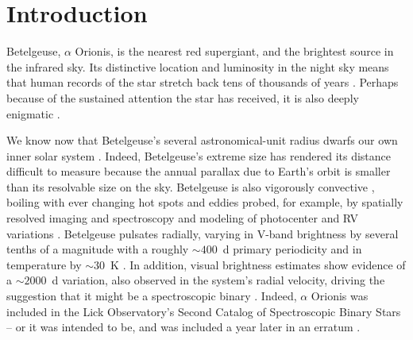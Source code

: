 \documentclass[twocolumn]{aastex631}
\begin{document}
\section{Introduction}

Betelgeuse, $\alpha$ Orionis, is the nearest red supergiant, and the brightest source in the infrared sky. Its distinctive location and luminosity in the night sky means that human records of the star stretch back tens of thousands of years \citep[e.g.][]{2014JAHH...17..180L,2018AuJAn..29...89H,2018JAHH...21....7S,2022MNRAS.516..693N,2023A&G....64.1.38N,2023mgm..conf.3519S}. Perhaps because of the sustained attention the star has received, it is also deeply enigmatic \citep{2023A&G....64.3.11W}. %

We know now that Betelgeuse's several astronomical-unit radius dwarfs our own inner solar system \citep{1921ApJ....53..249M,1996ApJ...463L..29G,2014A&A...572A..17M,2017ars..book.....L}. Indeed, Betelgeuse's extreme size has rendered its distance difficult to measure because the annual parallax due to Earth's orbit is smaller than its resolvable size on the sky. Betelgeuse is also vigorously convective \citep[e.g.][]{1998Natur.392..575L,2008AJ....135.1450G}, boiling with ever changing hot spots and eddies probed, for example, by spatially resolved imaging \citep{1996ApJ...463L..29G,2009A&A...508..923H,2018A&A...609A..67K} and spectroscopy \citep{2000ApJ...545..454L,2020ApJ...899...68D} and modeling of photocenter and RV variations \citep{2012JCoPh.231..919F,2017A&A...600A.137F,2022ApJ...929..156G,2023A&A...669A..49A}. Betelgeuse pulsates radially, varying in V-band brightness by several tenths of a magnitude with a roughly $\sim 400$~d primary periodicity \citep{2020ApJ...902...63J,2023NewA...9901962J} and in temperature by $\sim 30$~K \citep{2020ApJ...905...34H,2022JAVSO..50..205W}. In addition, visual brightness estimates show evidence of a $\sim 2000$~d variation, also observed in the system's radial velocity, driving the suggestion that it might be a spectroscopic binary \citep{1908PASP...20..227P,1911AN....187...33B,1916ApJ....44..250L,1928MNRAS..88..660S}. Indeed, $\alpha$ Orionis was included in the Lick Observatory's Second Catalog of Spectroscopic Binary Stars  -- or it was intended to be, and was included a year later in an erratum \citep{1910LicOB...6...17C,1911LicOB...6..154C}. 
\end{document}
